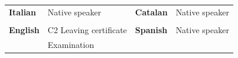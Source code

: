 \documentclass[12pt]{article}
\begin{document}
\begin{table}[H]
	\begin{tabular}{llll}
		\textbf{Italian} & Native speaker & \hspace{1cm} \textbf{Catalan} & Native speaker\\
		\\
		\textbf{English} & C2 Leaving certificate & \hspace{1cm} \textbf{Spanish} & Native speaker\\
        & \hspace{1em}\hspace{2pt} Examination \\
	\end{tabular}
\end{table}



\end{document}

